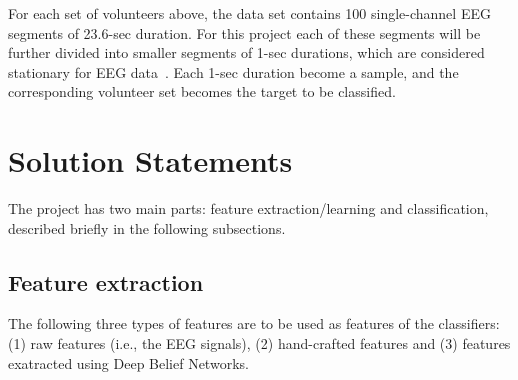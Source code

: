 \documentclass[12pt]{article}
\begin{document}
For each set of volunteers above, the data set contains 100 single-channel EEG segments of 23.6-sec duration. For this project each of these segments will be further divided into smaller segments of 1-sec durations, which are considered stationary for EEG data~\cite{nigam2004neural}. Each 1-sec duration become a sample, and the corresponding volunteer set becomes the target to be classified.

\section{Solution Statements}

The project has two main parts: feature extraction/learning and classification, described briefly in the following subsections.

\subsection{Feature extraction}
The following three types of features are to be used as features of the classifiers: (1) raw features (i.e., the EEG signals), (2) hand-crafted features and (3) features exatracted using Deep Belief Networks.
\end{document}
